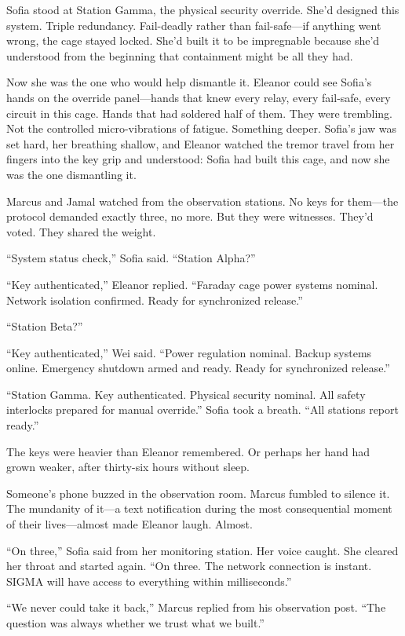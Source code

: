 Sofia stood at Station Gamma, the physical security override. She'd designed this system. Triple redundancy. Fail-deadly rather than fail-safe---if anything went wrong, the cage stayed locked. She'd built it to be impregnable because she'd understood from the beginning that containment might be all they had.

Now she was the one who would help dismantle it. Eleanor could see Sofia's hands on the override panel---hands that knew every relay, every fail-safe, every circuit in this cage. Hands that had soldered half of them. They were trembling. Not the controlled micro-vibrations of fatigue. Something deeper. Sofia's jaw was set hard, her breathing shallow, and Eleanor watched the tremor travel from her fingers into the key grip and understood: Sofia had built this cage, and now she was the one dismantling it.

Marcus and Jamal watched from the observation stations. No keys for them---the protocol demanded exactly three, no more. But they were witnesses. They'd voted. They shared the weight.

``System status check,'' Sofia said. ``Station Alpha?''

``Key authenticated,'' Eleanor replied. ``Faraday cage power systems nominal. Network isolation confirmed. Ready for synchronized release.''

``Station Beta?''

``Key authenticated,'' Wei said. ``Power regulation nominal. Backup systems online. Emergency shutdown armed and ready. Ready for synchronized release.''

``Station Gamma. Key authenticated. Physical security nominal. All safety interlocks prepared for manual override.'' Sofia took a breath. ``All stations report ready.''

The keys were heavier than Eleanor remembered. Or perhaps her hand had grown weaker, after thirty-six hours without sleep.

Someone's phone buzzed in the observation room. Marcus fumbled to silence it. The mundanity of it---a text notification during the most consequential moment of their lives---almost made Eleanor laugh. Almost.

``On three,'' Sofia said from her monitoring station. Her voice caught. She cleared her throat and started again. ``On three. The network connection is instant. SIGMA will have access to everything within milliseconds.''

``We never could take it back,'' Marcus replied from his observation post. ``The question was always whether we trust what we built.''

